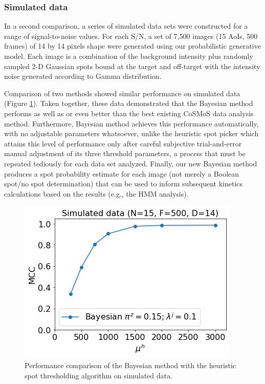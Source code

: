 \subsubsection{Simulated data}

In a second comparison, a series of simulated data sets were constructed for a range of signal-to-noise values. For each S/N, a set of 7,500 images (15 AoIs, 500 frames) of 14 by 14 pixels shape were generated using our probabilistic generative model. Each image is a combination of the background intensity plus randomly sampled 2-D Gaussian spots bound at the target and off-target with the intensity noise generated according to Gamma distribution.

Comparison of two methods showed similar performance on simulated data (Figure \ref{fig:simulated_data}). Taken together, these data demonstrated that the Bayesian method performs as well as or even better than the best existing CoSMoS data analysis method. Furthermore, Bayesian method achieves this performance automatically, with no adjustable parameters whatsoever, unlike the heuristic spot picker which attains this level of performance only after careful subjective trial-and-error manual adjustment of its three threshold parameters, a process that must be repeated tediously for each data set analyzed. Finally, our new Bayesian method produces a spot probability estimate for each image (not merely a Boolean spot/no spot determination) that can be used to inform subsequent kinetics calculations based on the results (e.g., the HMM analysis).

\begin{figure}
\includegraphics[width=\linewidth]{figures/figure5.png}
\caption{Performance comparison of the Bayesian method with the heuristic spot thresholding algorithm on simulated data.}
\label{fig:simulated_data}
\end{figure}